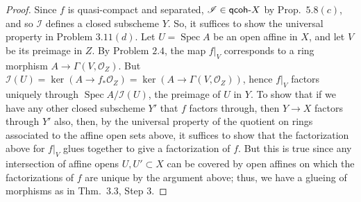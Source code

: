 \documentclass[12pt,letterpaper]{article}
\theoremstyle{definition}
\theoremstyle{remark}
\numberwithin{equation}{section}
\numberwithin{figure}{problem}
\DeclareMathOperator{\Spec}{Spec}
\newcommand{\II}{\mathscr{I}}
\newcommand{\OO}{\mathcal{O}}
\newcommand{\qcoh}{\mathsf{qcoh}\mathchar`-}
\begin{document}
\begin{proof}
  Since $f$ is quasi-compact and separated, $\II \in \qcoh X$ by Prop.~$5.8(c)$, and so $\II$ defines a closed subscheme $Y$. So, it suffices to show the universal property in Problem $3.11(d)$. Let $U = \Spec A$ be an open affine in $X$, and let $V$ be its preimage in $Z$. By Problem $2.4$, the map $f\vert_V$ corresponds to a ring morphism $A \to \Gamma(V,\OO_Z)$. But $\II(U) = \ker(A \to f_*\OO_Z) = \ker(A \to \Gamma(V,\OO_Z))$, hence $f\vert_V$ factors uniquely through $\Spec A/\II(U)$, the preimage of $U$ in $Y$. To show that if we have any other closed subscheme $Y'$ that $f$ factors through, then $Y \to X$ factors through $Y'$ also, then, by the universal property of the quotient on rings associated to the affine open sets above, it suffices to show that the factorization above for $f\vert_V$ glues together to give a factorization of $f$. But this is true since any intersection of affine opens $U,U' \subset X$ can be covered by open affines on which the factorizations of $f$ are unique by the argument above; thus, we have a glueing of morphisms as in Thm.~3.3, Step 3.
\end{proof}
\end{document}
